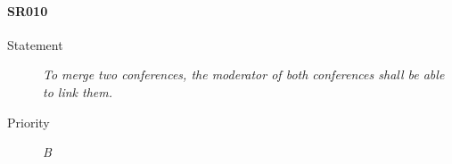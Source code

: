 \paragraph{SR010}
  \begin{description}
  \item [Statement] 
    \textit{ To merge two conferences, the moderator of both conferences shall be able to link them.}
  \item [Priority] \textit{B}
\end{description}
